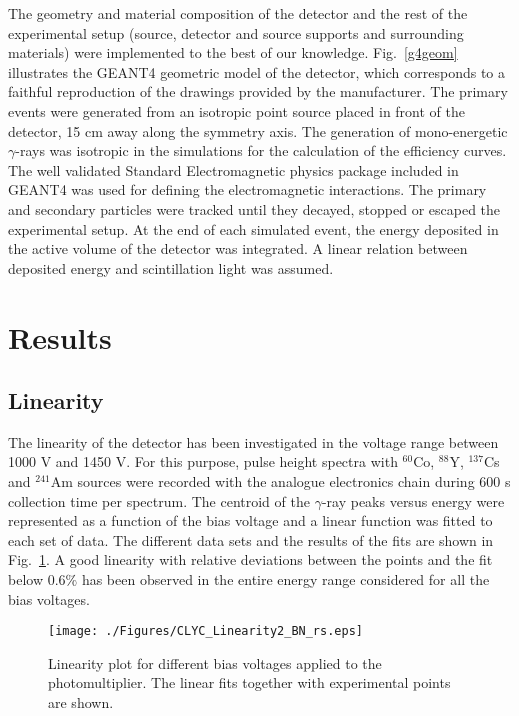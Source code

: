 \documentclass[review,number,sort&compress]{elsarticle}
\begin{document}
The geometry and material composition of the detector and the rest of the experimental setup (source, detector and source supports and surrounding materials) were implemented to the best of our knowledge. Fig.~\ref{g4geom} illustrates the GEANT4 geometric model of the detector, which corresponds to a faithful reproduction of the drawings provided by the manufacturer. The primary events were generated from an isotropic point source placed in front of the detector, 15 cm away along the symmetry axis. The generation of mono-energetic $\gamma$-rays was isotropic in the simulations for the calculation of the efficiency curves. The well validated Standard Electromagnetic physics package included in GEANT4 was used for defining the electromagnetic interactions. The primary and secondary particles were tracked until they decayed, stopped or escaped the experimental setup. At the end of each simulated event, the energy deposited in the active volume of the detector was integrated. A linear relation between deposited energy and scintillation light was assumed.

\section{Results}
\subsection{Linearity}
The linearity of the detector has been investigated in the voltage range between 1000 V and 1450 V. For this purpose, pulse height spectra with $^{60}$Co, $^{88}$Y, $^{137}$Cs and $^{241}$Am sources were recorded with the analogue electronics chain during 600 s collection time per spectrum. The centroid of the $\gamma$-ray peaks versus energy were represented as a function of the bias voltage and a linear function was fitted to each set of data. The different data sets and the results of the fits are shown in Fig.~\ref{linearity}. A good linearity with relative deviations between the points and the fit below 0.6$\%$ has been observed in the entire energy range considered for all the bias voltages.

\begin{figure}[h!]
\centering
\texttt{[image: ./Figures/CLYC\_Linearity2\_BN\_rs.eps]}
\caption{Linearity plot for different bias voltages applied to the photomultiplier. The linear fits together with experimental points are shown.}
\label{linearity}
\end{figure}
\end{document}

